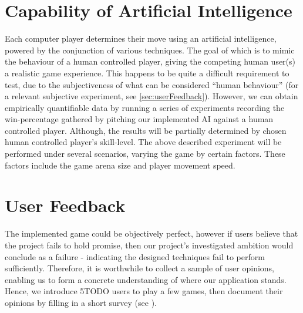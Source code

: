 \documentclass{standalone}
\begin{document}
	\section{Capability of Artificial Intelligence}
		Each computer player determines their move using an artificial intelligence, powered by the conjunction of various techniques. The goal of which is to mimic the behaviour of a human controlled player, giving the competing human user(s) a realistic game experience. This happens to be quite a difficult requirement to test, due to the subjectiveness of what can be considered \enquote{human behaviour} (for a relevant subjective experiment, see \autoref{sec:userFeedback}). However, we can obtain empirically quantifiable data by running a series of experiments recording the win-percentage gathered by pitching our implemented AI against a human controlled player. Although, the results will be partially determined by chosen human controlled player's skill-level. The above described experiment will be performed under several scenarios, varying the game by certain factors. These factors include the game arena size and player movement speed.

	\section{User Feedback} \label{sec:userFeedback}
		The implemented game could be objectively perfect, however if users believe that the project fails to hold promise, then our project's investigated ambition would conclude as a failure - indicating the designed techniques fail to perform sufficiently. Therefore, it is worthwhile to collect a sample of user opinions, enabling us to form a concrete understanding of where our application stands. Hence, we introduce 5TODO users to play a few games, then document their opinions by filling in a short survey (see ).
\end{document}
